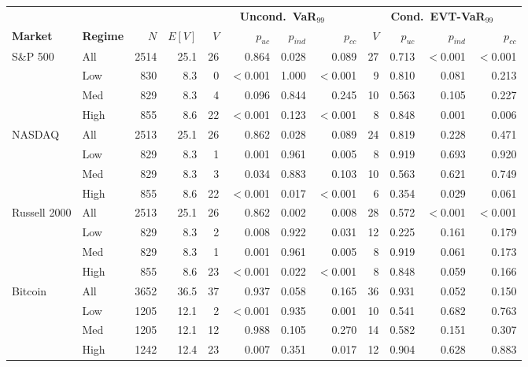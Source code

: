 \documentclass[]{interact}
\begin{document}
\begin{table}[H]
{\scriptsize
\renewcommand{\arraystretch}{1.15}
\setlength{\tabcolsep}{2.5pt}
\begin{tabular}{llrrrrrrrrrr}
\toprule
 & & & & \multicolumn{4}{c}{\textbf{Uncond.\ VaR$_{99}$}} & \multicolumn{4}{c}{\textbf{Cond.\ EVT-VaR$_{99}$}} \\
\cmidrule(lr){5-8}\cmidrule(lr){9-12}
\textbf{Market} & \textbf{Regime} & $N$ & $E[V]$ & $V$ & $p_{uc}$ & $p_{ind}$ & $p_{cc}$ & $V$ & $p_{uc}$ & $p_{ind}$ & $p_{cc}$ \\
\midrule
S\&P 500 & All & 2514 & 25.1 & 26 & 0.864 & 0.028 & 0.089 & 27 & 0.713 & $<$0.001 & $<$0.001 \\
 & Low & 830 & 8.3 & 0 & $<$0.001 & 1.000 & $<$0.001 & 9 & 0.810 & 0.081 & 0.213 \\
 & Med & 829 & 8.3 & 4 & 0.096 & 0.844 & 0.245 & 10 & 0.563 & 0.105 & 0.227 \\
 & High & 855 & 8.6 & 22 & $<$0.001 & 0.123 & $<$0.001 & 8 & 0.848 & 0.001 & 0.006 \\
\midrule
NASDAQ & All & 2513 & 25.1 & 26 & 0.862 & 0.028 & 0.089 & 24 & 0.819 & 0.228 & 0.471 \\
 & Low & 829 & 8.3 & 1 & 0.001 & 0.961 & 0.005 & 8 & 0.919 & 0.693 & 0.920 \\
 & Med & 829 & 8.3 & 3 & 0.034 & 0.883 & 0.103 & 10 & 0.563 & 0.621 & 0.749 \\
 & High & 855 & 8.6 & 22 & $<$0.001 & 0.017 & $<$0.001 & 6 & 0.354 & 0.029 & 0.061 \\
\midrule
Russell 2000 & All & 2513 & 25.1 & 26 & 0.862 & 0.002 & 0.008 & 28 & 0.572 & $<$0.001 & $<$0.001 \\
 & Low & 829 & 8.3 & 2 & 0.008 & 0.922 & 0.031 & 12 & 0.225 & 0.161 & 0.179 \\
 & Med & 829 & 8.3 & 1 & 0.001 & 0.961 & 0.005 & 8 & 0.919 & 0.061 & 0.173 \\
 & High & 855 & 8.6 & 23 & $<$0.001 & 0.022 & $<$0.001 & 8 & 0.848 & 0.059 & 0.166 \\
\midrule
Bitcoin & All & 3652 & 36.5 & 37 & 0.937 & 0.058 & 0.165 & 36 & 0.931 & 0.052 & 0.150 \\
 & Low & 1205 & 12.1 & 2 & $<$0.001 & 0.935 & 0.001 & 10 & 0.541 & 0.682 & 0.763 \\
 & Med & 1205 & 12.1 & 12 & 0.988 & 0.105 & 0.270 & 14 & 0.582 & 0.151 & 0.307 \\
 & High & 1242 & 12.4 & 23 & 0.007 & 0.351 & 0.017 & 12 & 0.904 & 0.628 & 0.883 \\
\bottomrule
\end{tabular}}
\label{tab:coverage}
\end{table}
\end{document}
